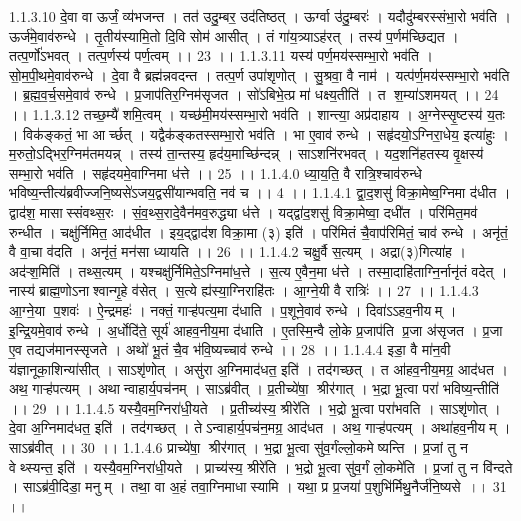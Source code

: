 1.1.3.10
दे॒वा वा ऊर्जं॒ व्य॑भजन्त । तत॑ उदु॒म्बर॒ उद॑तिष्ठत् । ऊर्ग्वा उ॑दु॒म्बरः॑ । यदौदु॑म्बरस्संभा॒रो भव॑ति । ऊर्ज॑मे॒वाव॑रुन्धे । तृ॒तीय॑स्यामि॒तो दि॒वि सोम॑ आसीत् । तं गा॑य॒त्र्याऽह॑रत् । तस्य॑ प॒र्णम॑च्छिद्यत । तत्प॒र्णो॑ऽभवत् । तत्प॒र्णस्य॑ पर्ण॒त्वम् ।। 23 ।।
1.1.3.11
यस्य॑ पर्ण॒मय॑स्सम्भा॒रो भव॑ति । सो॒म॒पी॒थमे॒वाव॑रुन्धे । दे॒वा वै ब्रह्म॑न्नवदन्त । तत्प॒र्ण उपा॑शृणोत् । सु॒श्रवा॒ वै नाम॑ । यत्प॑र्ण॒मय॑स्सम्भा॒रो भव॑ति । ब्र॒ह्म॒व॒र्च॒समे॒वाव॑ रुन्धे । प्र॒जाप॑तिर॒ग्निम॑सृजत । सो॑ऽबिभे॒त्प्र मा॑ धक्ष्य॒तीति॑ । त श॒म्या॑ऽशमयत् ।। 24 ।।
1.1.3.12
तच्छ॒म्यै॑ शमि॒त्वम् । यच्छ॑मी॒मय॑स्सम्भा॒रो भव॑ति । शान्त्या॒ अप्र॑दाहाय । अ॒ग्नेस्सृ॒ष्टस्य॑ य॒तः । विक॑ङ्कतं॒ भा आर्च्छत् । यद्वैक॑ङ्कतस्सम्भा॒रो भव॑ति । भा ए॒वाव॑ रुन्धे । सहृ॑दयो॒ऽग्निरा॒धेय॒ इत्या॑हुः । म॒रुतो॒ऽद्भिर॒ग्निम॑तमयन्न् । तस्य॑ ता॒न्तस्य॒ हृद॑य॒माच्छि॑न्दन्न् । साऽशनि॑रभवत् । यद॒शनि॑हतस्य वृ॒क्षस्य॑ सम्भा॒रो भव॑ति । सहृ॑दयमे॒वाग्निमा ध॑त्ते ।। 25 ।।
1.1.4.0
ध्या॒य॒ति॒ वै रात्रि॒श्चाव॑रुन्धे भविष्य॒न्तीत्य॑ब्रवीज्जनि॒ष्यसे॑ऽजय॒द्वसी॑यान्भवति॒ नव॑ च ।। 4 ।।
1.1.4.1
द्वा॒द॒शसु॑ विक्रा॒मेष्व॒ग्निमा द॑धीत । द्वाद॑श॒ मासास्संवथ्स॒रः । सं॒व॒थ्स॒रादे॒वैन॑मव॒रुद्ध्या ध॑त्ते । यद्द्वा॑द॒शसु॑ विक्रा॒मेष्वा॒ दधी॑त । परि॑मित॒मव॑ रुन्धीत । चक्षु॑र्निमित॒ आद॑धीत । इय॒द्द्वाद॑श विक्रा॒मा (३) इति॑ । परि॑मितं चै॒वाप॑रिमितं॒ चाव॑ रुन्धे । अनृ॑तं॒ वै वा॒चा व॑दति । अनृ॑तं॒ मन॑सा ध्यायति ।। 26 ।।
1.1.4.2
चक्षु॒र्वै स॒त्यम् । अद्रा(३)गित्या॑ह । अद॑ऱ्श॒मिति॑ । तथ्स॒त्यम् । यश्चक्षु॑र्निमिते॒ऽग्निमा॑ध॒त्ते । स॒त्य ए॒वैन॒मा ध॑त्ते । तस्मा॒दाहि॑ताग्नि॒र्नानृ॑तं वदेत् । नास्य॑ ब्राह्म॒णोऽनाश्वान्गृ॒हे व॑सेत् । स॒त्ये ह्य॑स्या॒ग्निराहि॑तः । आ॒ग्ने॒यी वै रात्रिः॑ ।। 27 ।।
1.1.4.3
आ॒ग्ने॒या प॒शवः॑ । ऐ॒न्द्रमहः॑ । नक्तं॒ गाऱ्ह॑पत्य॒मा द॑धाति । प॒शूने॒वाव॑ रुन्धे । दिवा॑ऽऽहव॒नीयम् । इ॒न्द्रि॒यमे॒वाव॑ रुन्धे । अ॒र्धोदि॑ते॒ सूर्य॑ आहव॒नीय॒मा द॑धाति । ए॒तस्मि॒न्वै लो॒के प्र॒जाप॑ति प्र॒जा अ॑सृजत । प्र॒जा ए॒व तद्यज॑मानस्सृजते । अथो॑ भू॒तं चै॒व भ॑वि॒ष्यच्चाव॑ रुन्धे ।। 28 ।।
1.1.4.4
इडा॒ वै मा॑न॒वी य॑ज्ञानूका॒शिन्या॑सीत् । साऽशृ॑णोत् । असु॑रा अ॒ग्निमाद॑धत॒ इति॑ । तद॑गच्छत् । त आ॑हव॒नीय॒मग्र॒ आद॑धत । अथ॒ गाऱ्ह॑पत्यम् । अथान्वाहार्य॒पच॑नम् । साऽब्र॑वीत् । प्र॒तीच्ये॑षा॒॒ श्रीर॑गात् । भ॒द्रा भू॒त्वा परा॑ भविष्य॒न्तीति॑ ।। 29 ।।
1.1.4.5
यस्यै॒वम॒ग्निरा॑धी॒यते । प्र॒तीच्य॑स्य॒ श्रीरे॑ति । भ॒द्रो भू॒त्वा परा॑भवति । साऽशृ॑णोत् । दे॒वा अ॒ग्निमाद॑धत॒ इति॑ । तद॑गच्छत् । तेऽन्वाहार्य॒पच॑न॒मग्र॒ आद॑धत । अथ॒ गाऱ्ह॑पत्यम् । अथा॑हव॒नीयम् । साऽब्र॑वीत् ।। 30 ।।
1.1.4.6
प्राच्ये॑षा॒॒ श्रीर॑गात् । भ॒द्रा भू॒त्वा सु॑व॒र्गंल्लो॒कमेष्यन्ति । प्र॒जां तु न वेथ्स्यन्त॒ इति॑ । यस्यै॒वम॒ग्निरा॑धी॒यते । प्राच्य॑स्य॒ श्रीरे॑ति । भ॒द्रो भू॒त्वा सु॑व॒र्गं लो॒कमे॑ति । प्र॒जां तु न वि॑न्दते । साऽब्र॑वी॒दिडा॒ मनुम् । तथा॒ वा अ॒हं तवा॒ग्निमाधास्यामि । यथा॒ प्र प्र॒जया॑ प॒शुभि॑र्मिथु॒नैर्ज॑नि॒ष्यसे ।। 31 ।।
